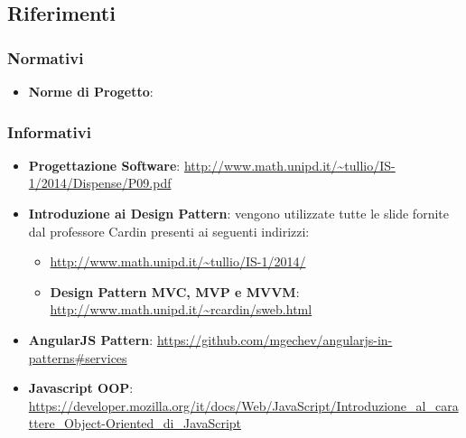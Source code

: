 	\subsection{Riferimenti} %
	\label{sub:riferimenti}
		\subsubsection{Normativi} %
		\label{ssub:normativi}
			\begin{itemize}
				\item \textbf{Norme di Progetto}: \docNameVersionNdP
			\end{itemize}

		\subsubsection{Informativi} %
		\label{ssub:informativi}
			\begin{itemize}
				\item \textbf{Progettazione Software}: \url{http://www.math.unipd.it/~tullio/IS-1/2014/Dispense/P09.pdf}
				\item \textbf{Introduzione ai Design Pattern}: vengono utilizzate tutte le slide fornite dal professore Cardin presenti ai seguenti indirizzi:
					\begin{itemize}
						\item \url{http://www.math.unipd.it/~tullio/IS-1/2014/}
						\item \textbf{Design Pattern MVC, MVP e MVVM}: \url{http://www.math.unipd.it/~rcardin/sweb.html}
					\end{itemize}
				\item \textbf{AngularJS Pattern}: \url{https://github.com/mgechev/angularjs-in-patterns#services}
				\item \textbf{Javascript OOP}: \url{https://developer.mozilla.org/it/docs/Web/JavaScript/Introduzione_al_carattere_Object-Oriented_di_JavaScript}
			\end{itemize}
